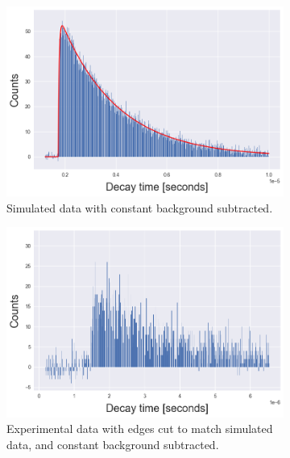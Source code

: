 \documentclass[11pt,a4paper]{article}
\begin{document}
\begin{figure}[h]
\centering
\begin{subfigure}[t]{0.45\textwidth}
\centering
\includegraphics[width=\textwidth]{simulated_histogram.png}
\caption{Simulated data with constant background subtracted.}
\label{fig:simulated_data}
\end{subfigure}
\hfill
\begin{subfigure}[t]{0.45\textwidth}
    \centering
    \includegraphics[width=\textwidth]{experimental_histogram.png}
    \caption{Experimental data with edges cut to match simulated data, and constant background subtracted.}
    \label{fig:experimental_data}
\end{subfigure}
\caption{}
\label{fig:data}
\end{figure}
\end{document}
